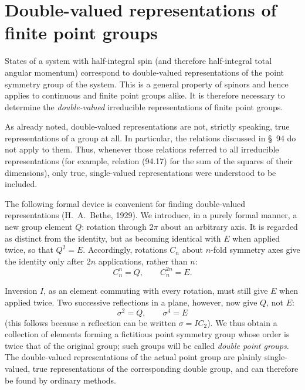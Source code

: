 \section{Double-valued representations of finite point groups}

States of a system with half-integral spin (and therefore half-integral total angular momentum) correspond to double-valued representations of the point symmetry group of the system. This is a general property of spinors and hence applies to continuous and finite point groups alike. It is therefore necessary to determine the \emph{double-valued} irreducible representations of finite point groups.

As already noted, double-valued representations are not, strictly speaking, true representations of a group at all. In particular, the relations discussed in \S~94 do not apply to them. Thus, whenever those relations referred to all irreducible representations (for example, relation (94.17) for the sum of the squares of their dimensions), only true, single-valued representations were understood to be included.

The following formal device is convenient for finding double-valued representations (H.~A.~Bethe, 1929). We introduce, in a purely formal manner, a new group element $Q$: rotation through $2\pi$ about an arbitrary axis. It is regarded as distinct from the identity, but as becoming identical with $E$ when applied twice, so that $Q^2=E$. Accordingly, rotations $C_n$ about $n$-fold symmetry axes give the identity only after $2n$ applications, rather than $n$:
\begin{equation}
 C_n^n=Q,\qquad C_n^{2n}=E. \tag{99.1}
\end{equation}

Inversion $I$, as an element commuting with every rotation, must still give $E$ when applied twice. Two successive reflections in a plane, however, now give $Q$, not $E$:
\begin{equation}
 \sigma^2=Q,\qquad \sigma^4=E \tag{99.2}
\end{equation}
(this follows because a reflection can be written $\sigma=IC_2$). We thus obtain a collection of elements forming a fictitious point symmetry group whose order is twice that of the original group; such groups will be called \emph{double point groups}. The double-valued representations of the actual point group are plainly single-valued, true representations of the corresponding double group, and can therefore be found by ordinary methods.

